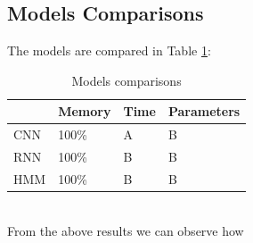 \subsection*{\textbf{Models Comparisons}}
The models are compared in Table \ref{table:comparisons}:\\
\begin{table}[h!]
\centering
\begin{tabular}{ p{1.5cm}|p{1.5cm}|p{1.5cm}|p{1.5cm} }
 \hline
  & Memory & Time & Parameters \\
\hline\hline
CNN & 100\% & A & B \\
\hline
RNN & 100\% & B  & B\\
\hline
HMM &100\% & B  & B\\
\hline
\end{tabular}
\caption{Models comparisons}
\label{table:comparisons}
\end{table}\\
\noindent From the above results we can observe how {}